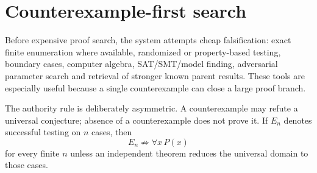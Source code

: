 \section{Counterexample-first search}

Before expensive proof search, the system attempts cheap falsification: exact finite enumeration where available, randomized or property-based testing, boundary cases, computer algebra, SAT/SMT/model finding, adversarial parameter search and retrieval of stronger known parent results. These tools are especially useful because a single counterexample can close a large proof branch.

The authority rule is deliberately asymmetric. A counterexample may refute a universal conjecture; absence of a counterexample does not prove it. If $E_n$ denotes successful testing on $n$ cases, then
\[
E_n\not\Rightarrow \forall x\,P(x)
\]
for every finite $n$ unless an independent theorem reduces the universal domain to those cases.
